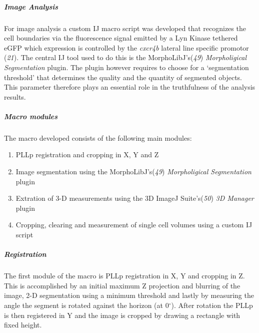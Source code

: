 \documentclass[11pt,singlespacinge,twoside]{reedthesis} %
\providecommand{\tightlist}{%
  \setlength{\itemsep}{0pt}\setlength{\parskip}{0pt}}
\begin{document}
\hypertarget{image-analysis-1}{%
\subparagraph{Image Analysis}\label{image-analysis-1}}

For image analysis a custom IJ macro script was developed that recognizes the cell boundaries via the fluorescence signal emitted by a Lyn Kinase tethered eGFP which expression is controlled by the \emph{cxcr4b} lateral line specific promotor (\emph{21}). The central IJ tool used to do this is the MorphoLibJ's(\emph{49}) \emph{Morpholigical Segmentation} plugin. The plugin however requires to choose for a `segmentation threshold' that determines the quality and the quantity of segmented objects. This parameter therefore plays an essential role in the truthfulness of the analysis results.

\hypertarget{macro-modules-1}{%
\subparagraph{Macro modules}\label{macro-modules-1}}

The macro developed consists of the following main modules:
\begin{enumerate}
\def\labelenumi{\arabic{enumi}.}
\tightlist
\item
  PLLp registration and cropping in X, Y and Z
\item
  Image segmentation using the MorphoLibJ's(\emph{49}) \emph{Morpholigical Segmentation} plugin
\item
  Extration of 3-D measurements using the 3D ImageJ Suite's(\emph{50}) \emph{3D Manager} plugin
\item
  Cropping, clearing and measurement of single cell volumes using a custom IJ script
\end{enumerate}
\hypertarget{registration}{%
\subparagraph{Registration}\label{registration}}

The first module of the macro is PLLp registration in X, Y and cropping in Z. This is accomplished by an initial maximum Z projection and blurring of the image, 2-D segmentation using a minimum threshold and lastly by measuring the angle the segment is rotated against the horizon (at 0\(^{\circ}\)). After rotation the PLLp is then registered in Y and the image is cropped by drawing a rectangle with fixed height.
\end{document}
